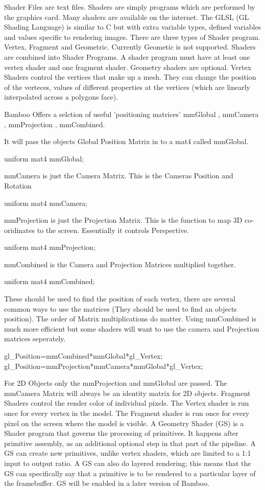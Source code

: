  Shader Files are text files. Shaders are simply programs which are performed by the graphics card. Many shaders are available on the internet. The GLSL (GL Shading Language) is similar to C but with extra variable types, defined variables and values specific to rendering images. There are three types of Shader program. Vertex, Fragment and Geometric. Currently Geometic is not supported. Shaders are combined into Shader Programs. A shader program must have at least one vertex shader and one fragment shader. Geometry shaders are optional. Vertex Shaders control the vertices that make up a mesh. They can change the position of the verteces, values of different properties at the vertices (which are linearly interpolated across a polygons face). \par
 Bamboo Offers a selction of useful 'positioning matrices' mmGlobal , mmCamera , mmProjection , mmCombined. \par
 It will pass the objects Global Position Matrix in to a mat4 called mmGlobal. 
\begin{DoxyCode}
 uniform mat4 mmGlobal;
\end{DoxyCode}
 mmCamera is just the Camera Matrix. This is the Cameras Position and Rotation 
\begin{DoxyCode}
 uniform mat4 mmCamera;
\end{DoxyCode}
 mmProjection is just the Projection Matrix. This is the function to map 3D co-\/oridinates to the screen. Essentially it controls Perspective. 
\begin{DoxyCode}
 uniform mat4 mmProjection;
\end{DoxyCode}
 mmCombined is the Camera and Projection Matrices multiplied together. 
\begin{DoxyCode}
 uniform mat4 mmCombined;
\end{DoxyCode}
 These should be used to find the position of each vertex, there are several common ways to use the matrices (They should be used to find an objects position). The order of Matrix multiplications do matter. Using mmCombined is much more efficient but some shaders will want to use the camera and Projection matrices seperately. 
\begin{DoxyCode}
 gl_Position=mmCombined*mmGlobal*gl_Vertex;
 gl_Position=mmProjection*mmCamera*mmGlobal*gl_Vertex;
\end{DoxyCode}
 For 2D Objects only the mmProjection and mmGlobal are passed. The mmCamera Matrix will always be an identity matrix for 2D objects. Fragment Shaders control the render color of individual pixels. The Vertex shader is run once for every vertex in the model. The Fragment shader is run once for every pixel on the screen where the model is visible. A Geometry Shader (GS) is a Shader program that governs the processing of primitives. It happens after primitive assembly, as an additional optional step in that part of the pipeline. A GS can create new primitives, unlike vertex shaders, which are limited to a 1:1 input to output ratio. A GS can also do layered rendering; this means that the GS can specifically say that a primitive is to be rendered to a particular layer of the framebuffer. GS will be enabled in a later version of Bamboo. \par
